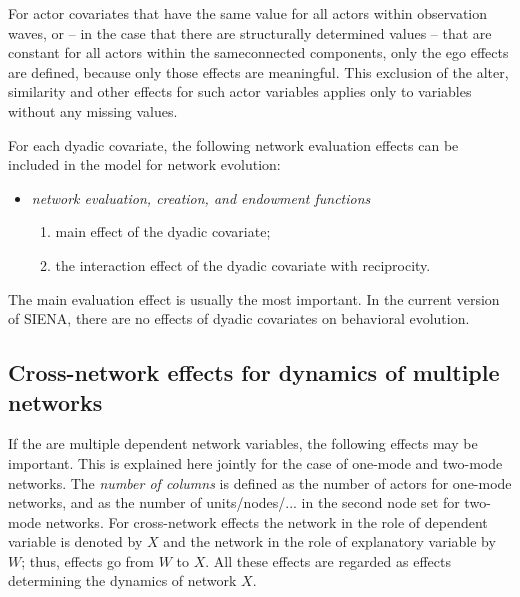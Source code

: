 \documentclass[a4paper,fleqn,11pt]{article}
\newcommand{\+}{\, + \,}
\newcommand{\si}{{\sf SIENA}}
\begin{document}
{For actor covariates that have the same value for all actors within observation waves,
or -- in the case that there are structurally determined values --
that are constant for all actors within the sameconnected components,
only the ego effects are defined, because only those
effects are meaningful.
This exclusion of the alter, similarity and other effects for
such actor variables applies only to variables without any missing values.

For each dyadic covariate, the following network evaluation effects
can be included in the model for network evolution:
\begin{itemize}
\item {\em network evaluation, creation, and endowment functions}
\begin{enumerate}
\item main effect of the dyadic covariate;
\item the interaction
effect of the dyadic covariate with reciprocity.
\end{enumerate}
\end{itemize}
The main evaluation effect is usually the most important. In the
current version of \si, there are no effects of dyadic covariates
on behavioral evolution.

\subsection{Cross-network effects for dynamics of multiple networks}

If the are multiple dependent network variables,
the following effects may be important.
This is explained here jointly for the case of one-mode and two-mode
networks. The \emph{number of columns} is defined as the number of actors
for one-mode networks, and as the number of units/nodes/...
in the second node set for two-mode networks.
For cross-network effects the network in the role of dependent variable
is denoted by $X$ and the network in the role of explanatory variable
by $W$; thus, effects go from $W$ to $X$.
All these effects are regarded as effects determining the dynamics of network $X$.

}
\end{document}
